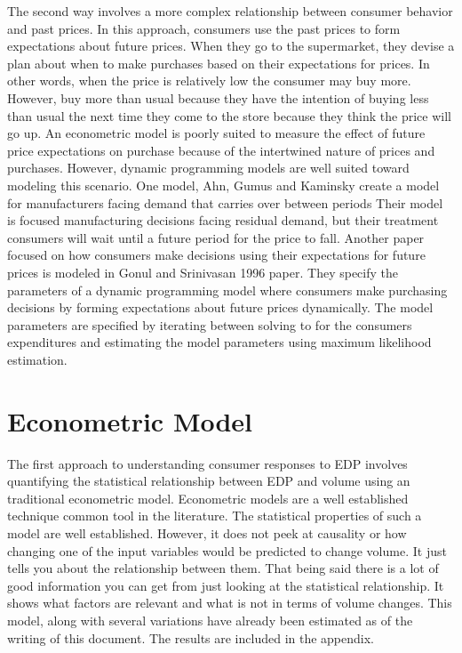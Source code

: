 \documentclass{article}
\begin{document}
The second way involves a more complex relationship between consumer behavior and past prices. In this approach, consumers use the past prices to form expectations about future prices. When they go to the supermarket, they devise a plan about when to make purchases based on their expectations for prices. In other words, when the price is relatively low the consumer may buy more. However, buy more than usual because they have the intention of buying less than usual the next time they come to the store because they think the price will go up. An econometric model is poorly suited to measure the effect of future price expectations on purchase because of the intertwined nature of prices and purchases. However, dynamic programming models are well suited toward modeling this scenario.  One model, Ahn, Gumus and Kaminsky create a model for manufacturers facing demand that carries over between periods \cite{ahn} Their model is focused manufacturing decisions facing residual demand, but their treatment consumers will wait until a future period for the price to fall. Another paper focused on how consumers make decisions using their expectations for future prices is modeled in Gonul and Srinivasan 1996 paper\cite{gonul}. They specify the parameters of a dynamic programming model where consumers make purchasing decisions by forming expectations about future prices dynamically. The model parameters are specified by iterating between solving to for the consumers expenditures and estimating the model parameters using maximum likelihood estimation.

\section{Econometric Model}

The first approach to understanding consumer responses to EDP involves quantifying the statistical relationship between EDP and volume using an traditional econometric model.  Econometric models are a well established technique common tool in the literature. The statistical properties of such a model are well established. However, it does not peek at causality or how changing one of the input variables would be predicted to change volume. It just tells you about the relationship between them. That being said there is a lot of good information you can get from just looking at the statistical relationship. It shows what factors are relevant and what is not in terms of volume changes. This model, along with several variations have already been estimated as of the writing of this document. The results are included in the appendix.
\end{document}
